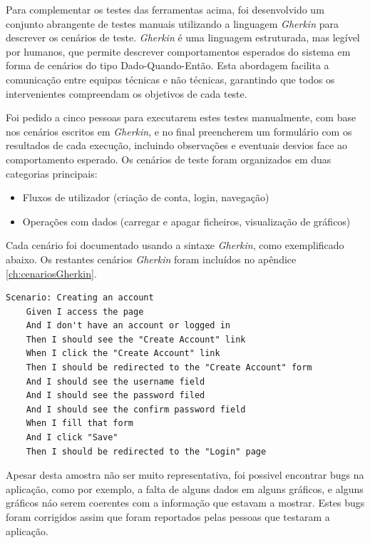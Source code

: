 Para complementar os testes das ferramentas acima, foi desenvolvido um conjunto abrangente de testes manuais utilizando a linguagem \textit{Gherkin} para descrever os cenários de teste. \textit{Gherkin} é uma linguagem estruturada, mas legível por humanos, que permite descrever comportamentos esperados do sistema em forma de cenários do tipo Dado-Quando-Então. Esta abordagem facilita a comunicação entre equipas técnicas e não técnicas, garantindo que todos os intervenientes compreendam os objetivos de cada teste.

Foi pedido a cinco pessoas para executarem estes testes manualmente, com base nos cenários escritos em \textit{Gherkin}, e no final preencherem um formulário com os resultados de cada execução, incluindo observações e eventuais desvios face ao comportamento esperado. Os cenários de teste foram organizados em duas categorias principais:

\begin{itemize}
    \item Fluxos de utilizador (criação de conta, login, navegação)
    \item Operações com dados (carregar e apagar ficheiros, visualização de gráficos)
\end{itemize}

Cada cenário foi documentado usando a sintaxe \textit{Gherkin}, como exemplificado abaixo. Os restantes cenários \textit{Gherkin} foram incluídos no apêndice \ref{ch:cenariosGherkin}.

\begin{lstlisting}[language=Gherkin, caption={Excerto do código \textit{Gherkin} do cenário de teste para a criação de uma conta}]
Scenario: Creating an account
	Given I access the page 
	And I don't have an account or logged in
	Then I should see the "Create Account" link
	When I click the "Create Account" link
	Then I should be redirected to the "Create Account" form
	And I should see the username field
	And I should see the password filed
	And I should see the confirm password field
	When I fill that form
	And I click "Save"
	Then I should be redirected to the "Login" page
\end{lstlisting}

Apesar desta amostra não ser muito representativa, foi possivel encontrar bugs na aplicação, como por exemplo, a falta de alguns dados em alguns gráficos, e alguns gráficos náo serem coerentes com a informação que estavam a mostrar. Estes bugs foram corrigidos assim que foram reportados pelas pessoas que testaram a aplicação.


